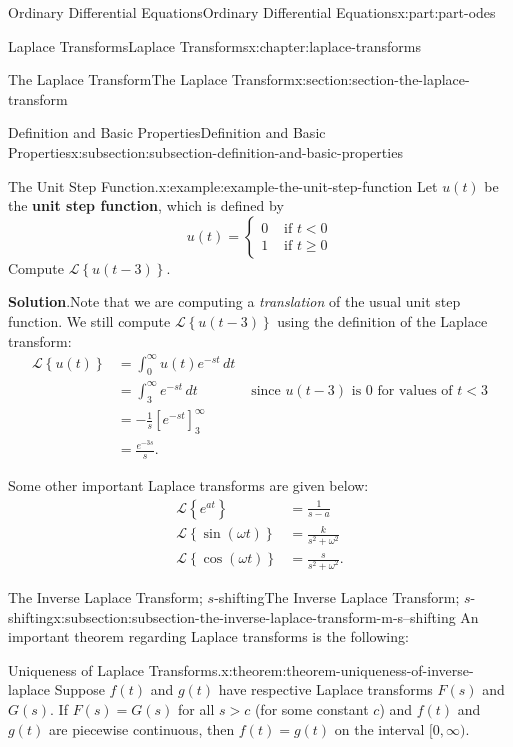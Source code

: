 \documentclass[oneside,10pt,]{book}
\newcommand{\blocktitlefont}{\relax}
\newcommand{\terminology}[1]{\textbf{#1}}
\numberwithin{equation}{part}
\newcommand{\Int}[2]{\int_{#1}^{#2}}
\newcommand{\Laplace}[1]{\mathcal{L}\left\{#1\right\}}
\newcommand{\lt}{<}
\newcommand{\gt}{>}
\newcommand{\amp}{&}
\begin{document}
\begin{partptx}{Ordinary Differential Equations}{}{Ordinary Differential Equations}{}{}{x:part:part-odes}
\begin{chapterptx}{Laplace Transforms}{}{Laplace Transforms}{}{}{x:chapter:laplace-transforms}
\begin{sectionptx}{The Laplace Transform}{}{The Laplace Transform}{}{}{x:section:section-the-laplace-transform}
\begin{subsectionptx}{Definition and Basic Properties}{}{Definition and Basic Properties}{}{}{x:subsection:subsection-definition-and-basic-properties}
\begin{example}{The Unit Step Function.}{x:example:example-the-unit-step-function}%
Let \(u(t)\) be the \terminology{unit step function}, which is defined by%
\begin{equation*}
u(t) = 
\begin{cases}
0 \amp\text{ if } t\lt 0  \\
1 \amp\text{ if } t\geq0
\end{cases}
\end{equation*}
Compute \(\Laplace{u(t-3)}\).%
\par\smallskip%
\noindent\textbf{\blocktitlefont Solution}.\hypertarget{g:solution:idp105548781487264}{}\quad{}Note that we are computing a \emph{translation} of the usual unit step function. We still compute \(\Laplace{u(t-3)}\) using the definition of the Laplace transform:%
\begin{align*}
\Laplace{u(t)} \amp= \Int{0}{\infty}u(t)e^{-st}\,dt\\
\amp= \Int{3}{\infty}e^{-st}\,dt \amp\text{ since }u(t-3) \text{ is }0 \text{ for values of }t\lt3\\
\amp= -\frac{1}{s}\left[e^{-st}\right]_{3}^{\infty}\\
\amp= \frac{e^{-3s}}{s}\text{.}
\end{align*}
%
\end{example}
Some other important Laplace transforms are given below:%
\begin{align*}
\Laplace{e^{at}} \amp= \frac{1}{s-a}\\
\Laplace{\sin(\omega t)} \amp= \frac{k}{s^{2}+\omega^{2}}\\
\Laplace{\cos(\omega t)} \amp= \frac{s}{s^{2}+\omega^{2}}\text{.}
\end{align*}
%
\end{subsectionptx}
%
%
\typeout{************************************************}
\typeout{************************************************}
%
\begin{subsectionptx}{The Inverse Laplace Transform; \(s\)-shifting}{}{The Inverse Laplace Transform; \(s\)-shifting}{}{}{x:subsection:subsection-the-inverse-laplace-transform-m-s--shifting}
An important theorem regarding Laplace transforms is the following:%
\begin{theorem}{Uniqueness of Laplace Transforms.}{}{x:theorem:theorem-uniqueness-of-inverse-laplace}%
Suppose \(f(t)\) and \(g(t)\) have respective Laplace transforms \(F(s)\) and \(G(s)\). If \(F(s) = G(s)\) for all \(s\gt c\) (for some constant \(c\)) and \(f(t)\) and \(g(t)\) are piecewise continuous, then \(f(t) = g(t)\) on the interval \([0,\infty)\).%

\end{theorem}
\end{subsectionptx}
\end{sectionptx}
\end{chapterptx}
\end{partptx}
\end{document}
